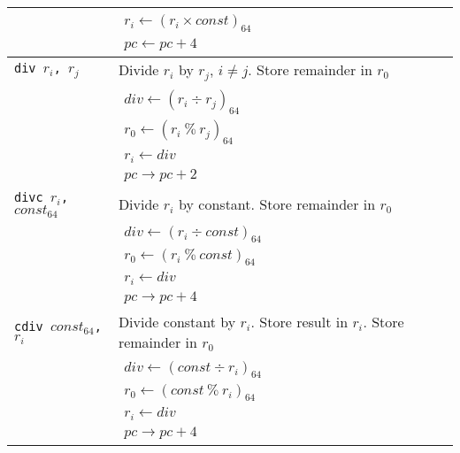 \begin{longtable}{|p{10em}|p{30em}|}
			& $\begin{array}{lcl} 
			r_i \leftarrow (r_i \times const)_{64} \\
			pc \leftarrow pc + 4
			\end{array}$ \\
			\hline 
			\texttt{div $r_i$, $r_j$} & Divide $r_i$ by $r_j$, $i \neq j$. Store remainder in $r_0$ \\
			& $\begin{array}{lcl}
			div \leftarrow (r_i \div r_j)_{64} \\
			r_0 \leftarrow (r_i ~\%~ r_j)_{64} \\
			r_i \leftarrow div \\
			pc \rightarrow pc + 2
			\end{array}$ \\
			\hline 
			\texttt{divc $r_i$, $const_{64}$} & Divide $r_i$ by constant. Store remainder in $r_0$ \\
			& $\begin{array}{lcl}
			div \leftarrow (r_i \div const)_{64} \\
			r_0 \leftarrow (r_i ~\%~ const)_{64} \\
			r_i \leftarrow div \\
			pc \rightarrow pc + 4
			\end{array}$ \\
			\hline 
			\texttt{cdiv $const_{64}$, $r_i$} & Divide constant by $r_i$. Store result in $r_i$. Store remainder in $r_0$ \\
			& $\begin{array}{lcl}
			div \leftarrow (const \div r_i)_{64} \\
			r_0 \leftarrow (const ~\%~ r_i)_{64} \\
			r_i \leftarrow div \\
			pc \rightarrow pc + 4
			\end{array}$ \\
			\hline
		\end{longtable}
		
